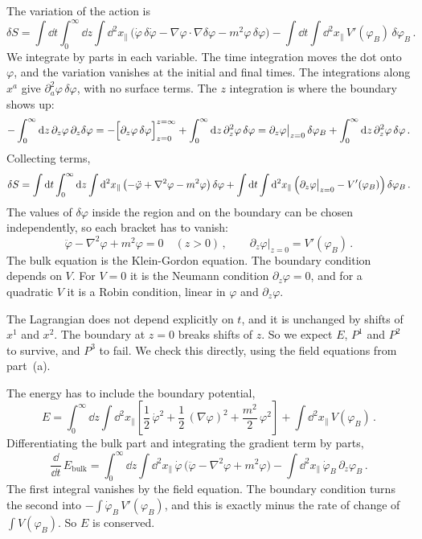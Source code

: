  The variation of the action is
\[
\delta S=\int \dd t\int_0^\infty \dd z\int \dd^2x_\parallel\,
\bigl(\dot\varphi\,\delta\dot\varphi-\nabla\varphi\cdot\nabla\delta\varphi-m^2\varphi\,\delta\varphi\bigr)
-\int \dd t\int \dd^2x_\parallel\,V'(\varphi_B)\,\delta\varphi_B\,.
\]
We integrate by parts in each variable. The time integration moves the dot
onto $\varphi$, and the variation vanishes at the initial and final times. The
integrations along $x^a$ give $\partial_a^2\varphi\,\delta\varphi$, with no
surface terms. The $z$ integration is where the boundary shows up:
\[
-\int_0^\infty \mathop{}\!\mathrm{d} z\,\partial_z\varphi\,\partial_z\delta\varphi
=-\Bigl[\partial_z\varphi\,\delta\varphi\Bigr]_{z=0}^{z=\infty}+\int_0^\infty \mathop{}\!\mathrm{d} z\,\partial_z^2\varphi\,\delta\varphi
=\partial_z\varphi\big|_{z=0}\,\delta\varphi_B+\int_0^\infty \mathop{}\!\mathrm{d} z\,\partial_z^2\varphi\,\delta\varphi\,.
\]
Collecting terms,
\[
\delta S=\int \mathop{}\!\mathrm{d} t\int_0^\infty \mathop{}\!\mathrm{d} z\int \mathop{}\!\mathrm{d}^2x_\parallel\,\bigl(-\ddot\varphi+\nabla^2\varphi-m^2\varphi\bigr)\,\delta\varphi
+\int \mathop{}\!\mathrm{d} t\int \mathop{}\!\mathrm{d}^2x_\parallel\,\Bigl(\partial_z\varphi\big|_{z=0}-V'(\varphi_B)\Bigr)\,\delta\varphi_B\,.
\]
The values of $\delta\varphi$ inside the region and on the boundary can be
chosen independently, so each bracket has to vanish:
\[
\ddot\varphi-\nabla^2\varphi+m^2\varphi=0\quad(z>0)\,,\qquad
\partial_z\varphi\big|_{z=0}=V'(\varphi_B)\,.
\]
The bulk equation is the Klein-Gordon equation. The boundary condition
depends on $V$. For $V=0$ it is the Neumann condition
$\partial_z\varphi=0$, and for a quadratic $V$ it is a Robin condition, linear
in $\varphi$ and $\partial_z\varphi$.

 The Lagrangian does not depend explicitly on $t$, and it is
unchanged by shifts of $x^1$ and $x^2$. The boundary at $z=0$ breaks shifts of
$z$. So we expect $E$, $P^1$ and $P^2$ to survive, and $P^3$ to fail. We check
this directly, using the field equations from part~(a).

The energy has to include the boundary potential,
\[
E=\int_0^\infty \dd z\int \dd^2x_\parallel\left[\frac12\,\dot\varphi^2+\frac12\,(\nabla\varphi)^2+\frac{m^2}2\,\varphi^2\right]+\int \dd^2x_\parallel\,V(\varphi_B)\,.
\]
Differentiating the bulk part and integrating the gradient term by parts,
\[
\frac{\dd}{\dd t}\,E_{\text{bulk}}=\int_0^\infty \dd z\int \dd^2x_\parallel\,\dot\varphi\,\bigl(\ddot\varphi-\nabla^2\varphi+m^2\varphi\bigr)
-\int \dd^2x_\parallel\,\dot\varphi_B\,\partial_z\varphi_B\,.
\]
The first integral vanishes by the field equation. The boundary condition
turns the second into $-\int \dot\varphi_B\,V'(\varphi_B)$, and this is exactly
minus the rate of change of $\int V(\varphi_B)$. So $E$ is conserved.

